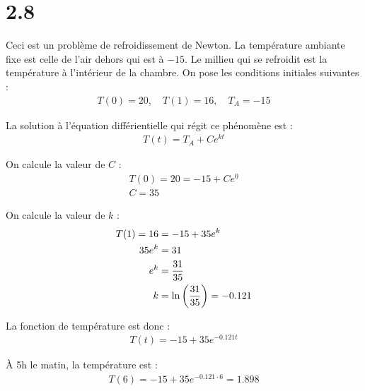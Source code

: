\section*{2.8}

Ceci est un problème de refroidissement de Newton. La température ambiante fixe
est celle de l'air dehors qui est à $-15$. Le millieu qui se refroidit est la
température à l'intérieur de la chambre. On pose les conditions initiales
suivantes :
\begin{align*}
    T(0) = 20,\quad T(1) = 16,\quad T_A = -15
\end{align*}

La solution à l'équation différientielle qui régit ce phénomène est :
\begin{align*}
    T(t) = T_A +Ce^{kt}
\end{align*}

On calcule la valeur de $C$ :
\begin{gather*}
    T(0) = 20 = -15 +Ce^{0} \\
    C = 35
\end{gather*}

On calcule la valeur de $k$ :
\begin{align*}
    T(1) = 16 &= -15 +35e^{k} \\
    35e^k &= 31 \\
    e^k &= \dfrac{31}{35} \\
    k &= \ln\left({\dfrac{31}{35}}\right) = -0.121
\end{align*}

La fonction de température est donc :
\begin{align*}
    T(t) = -15 + 35e^{-0.121t}
\end{align*}

À 5h le matin, la température est :
\begin{align*}
    T(6) = -15 + 35e^{-0.121\cdot 6} = 1.898
\end{align*}

